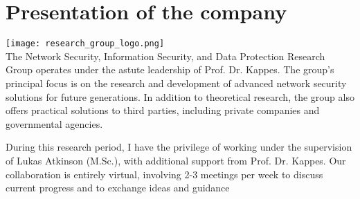\chapter{\centering Presentation of the company}

\texttt{[image: research\_group\_logo.png]} \\

The Network Security, Information Security, and Data Protection Research Group 
operates under the astute leadership of Prof. Dr. Kappes. The group's principal 
focus is on the research and development of advanced network security solutions 
for future generations. In addition to theoretical research, the group also offers
practical solutions to third parties, including private companies and governmental agencies.

During this research period, I have the privilege of working under the supervision 
of Lukas Atkinson (M.Sc.), with additional support from Prof. Dr. Kappes. Our 
collaboration is entirely virtual, involving 2-3 meetings per week to discuss 
current progress and to exchange ideas and guidance
